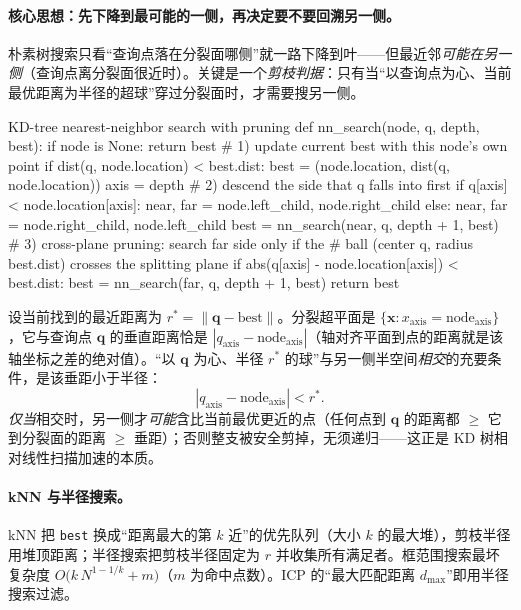 \paragraph{核心思想：先下降到最可能的一侧，再决定要不要回溯另一侧。}
朴素树搜索只看“查询点落在分裂面哪侧”就一路下降到叶——但最近邻\emph{可能在另一侧}（查询点离分裂面很近时）。关键是一个\emph{剪枝判据}：只有当“以查询点为心、当前最优距离为半径的超球”穿过分裂面时，才需要搜另一侧。

\begin{algo}\label{alg:pc-kdnn}
\begin{codebox}[Python]{KD-tree nearest-neighbor search with pruning}
def nn_search(node, q, depth, best):
    if node is None:
        return best
    # 1) update current best with this node's own point
    if dist(q, node.location) < best.dist:
        best = (node.location, dist(q, node.location))
    axis = depth %
    # 2) descend the side that q falls into first
    if q[axis] < node.location[axis]:
        near, far = node.left_child, node.right_child
    else:
        near, far = node.right_child, node.left_child
    best = nn_search(near, q, depth + 1, best)
    # 3) cross-plane pruning: search far side only if the
    #    ball (center q, radius best.dist) crosses the splitting plane
    if abs(q[axis] - node.location[axis]) < best.dist:
        best = nn_search(far, q, depth + 1, best)
    return best
\end{codebox}
\end{algo}

\begin{derivation}[剪枝判据的几何证明]
设当前找到的最近距离为 $r^\ast=\|\mathbf{q}-\text{best}\|$。分裂超平面是 $\{\mathbf{x}:x_{\text{axis}}=\text{node}_{\text{axis}}\}$，它与查询点 $\mathbf{q}$ 的垂直距离恰是 $|q_{\text{axis}}-\text{node}_{\text{axis}}|$（轴对齐平面到点的距离就是该轴坐标之差的绝对值）。“以 $\mathbf{q}$ 为心、半径 $r^\ast$ 的球”与另一侧半空间\emph{相交}的充要条件，是该垂距小于半径：
\begin{equation}
  |q_{\text{axis}}-\text{node}_{\text{axis}}|<r^\ast.
  \label{eq:pc-kd-prune}
\end{equation}
\emph{仅当}相交时，另一侧才\emph{可能}含比当前最优更近的点（任何点到 $\mathbf{q}$ 的距离都 $\ge$ 它到分裂面的距离 $\ge$ 垂距）；否则整支被安全剪掉，无须递归——这正是 KD 树相对线性扫描加速的本质。
\end{derivation}

\paragraph{kNN 与半径搜索。}
kNN 把 \texttt{best} 换成“距离最大的第 $k$ 近”的优先队列（大小 $k$ 的最大堆），剪枝半径用堆顶距离；半径搜索把剪枝半径固定为 $r$ 并收集所有满足者。框范围搜索最坏复杂度 $O\!\big(k\,N^{1-1/k}+m\big)$（$m$ 为命中点数）。ICP 的“最大匹配距离 $d_{\max}$”即用半径搜索过滤。


